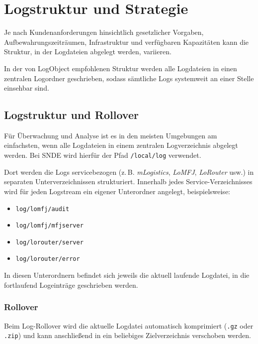 \chapter{Logstruktur und Strategie}

Je nach Kundenanforderungen hinsichtlich gesetzlicher Vorgaben, Aufbewahrungszeiträumen, Infrastruktur und verfügbaren Kapazitäten kann die Struktur, in der Logdateien abgelegt werden, variieren.

In der von LogObject empfohlenen Struktur werden alle Logdateien in einen zentralen Logordner geschrieben, sodass sämtliche Logs systemweit an einer Stelle einsehbar sind.

\section{Logstruktur und Rollover}

Für Überwachung und Analyse ist es in den meisten Umgebungen am einfachsten, wenn alle Logdateien in einem zentralen Logverzeichnis abgelegt werden.
Bei SNDE wird hierfür der Pfad \texttt{/local/log} verwendet.

Dort werden die Logs servicebezogen (z.\,B. \textit{mLogistics}, \textit{LoMFJ}, \textit{LoRouter} usw.) in separaten Unterverzeichnissen strukturiert.
Innerhalb jedes Service-Verzeichnisses wird für jeden Logstream ein eigener Unterordner angelegt, beispielsweise:

\begin{itemize}
	\item \texttt{log/lomfj/audit}
	\item \texttt{log/lomfj/mfjserver}
	\item \texttt{log/lorouter/server}
	\item \texttt{log/lorouter/error}
\end{itemize}

In diesen Unterordnern befindet sich jeweils die aktuell laufende Logdatei, in die fortlaufend Logeinträge geschrieben werden.

\subsection{Rollover}

Beim Log-Rollover wird die aktuelle Logdatei automatisch komprimiert (\texttt{.gz} oder \texttt{.zip}) und kann anschließend in ein beliebiges Zielverzeichnis verschoben werden.

